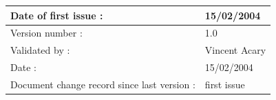 \begin{tabular}{|p{}|p{}|}
\hline
Date of first issue : &\textsf{15/02/2004}\\
\hline \hline
Version number : &\textsf{1.0}\\ 
Validated by :& \textsf{Vincent Acary}\\
Date : & \textsf{15/02/2004} \\
Document change record since last version : &\textsf{first issue} \\
\hline
\end{tabular}

%

